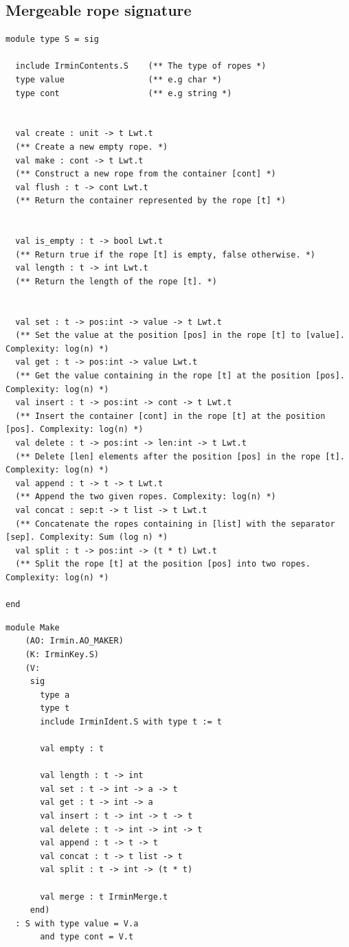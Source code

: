 \documentclass{article}
\begin{document}
\subsection{Mergeable rope signature\label{appendixrope}}
\begin{lstlisting}
module type S = sig

  include IrminContents.S    (** The type of ropes *)
  type value                 (** e.g char *)
  type cont                  (** e.g string *)


  val create : unit -> t Lwt.t
  (** Create a new empty rope. *)
  val make : cont -> t Lwt.t
  (** Construct a new rope from the container [cont] *)
  val flush : t -> cont Lwt.t
  (** Return the container represented by the rope [t] *)


  val is_empty : t -> bool Lwt.t
  (** Return true if the rope [t] is empty, false otherwise. *)
  val length : t -> int Lwt.t
  (** Return the length of the rope [t]. *)


  val set : t -> pos:int -> value -> t Lwt.t
  (** Set the value at the position [pos] in the rope [t] to [value]. Complexity: log(n) *)
  val get : t -> pos:int -> value Lwt.t
  (** Get the value containing in the rope [t] at the position [pos]. Complexity: log(n) *)
  val insert : t -> pos:int -> cont -> t Lwt.t
  (** Insert the container [cont] in the rope [t] at the position [pos]. Complexity: log(n) *)
  val delete : t -> pos:int -> len:int -> t Lwt.t
  (** Delete [len] elements after the position [pos] in the rope [t]. Complexity: log(n) *)
  val append : t -> t -> t Lwt.t
  (** Append the two given ropes. Complexity: log(n) *)
  val concat : sep:t -> t list -> t Lwt.t
  (** Concatenate the ropes containing in [list] with the separator [sep]. Complexity: Sum (log n) *)
  val split : t -> pos:int -> (t * t) Lwt.t
  (** Split the rope [t] at the position [pos] into two ropes. Complexity: log(n) *)

end
\end{lstlisting}

\bigskip

\begin{lstlisting}
module Make
    (AO: Irmin.AO_MAKER)
    (K: IrminKey.S)
    (V:
     sig
       type a
       type t
       include IrminIdent.S with type t := t

       val empty : t

       val length : t -> int
       val set : t -> int -> a -> t
       val get : t -> int -> a
       val insert : t -> int -> t -> t
       val delete : t -> int -> int -> t
       val append : t -> t -> t
       val concat : t -> t list -> t
       val split : t -> int -> (t * t)

       val merge : t IrminMerge.t
     end)
  : S with type value = V.a
       and type cont = V.t

\end{lstlisting}
\end{document}
